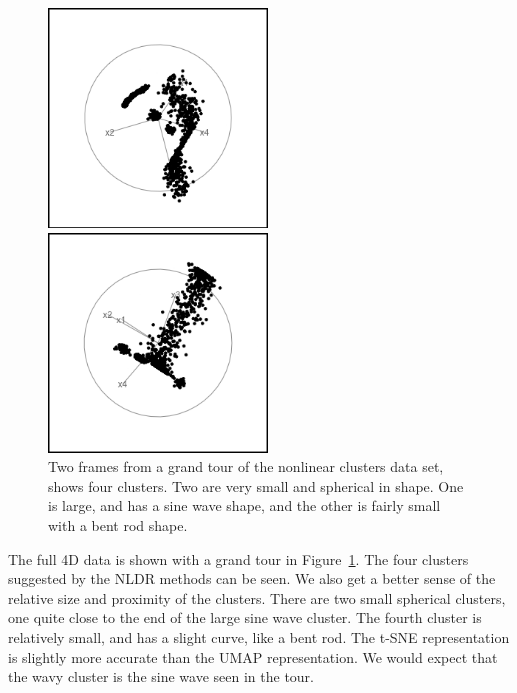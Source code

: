 \documentclass[
  letterpaper,
]{krantz}
\begin{document}
\begin{figure}

\begin{minipage}{0.50\linewidth}
\includegraphics[width=2.29167in,height=\textheight,keepaspectratio]{images/clusters_nonlin_60.png}\end{minipage}%
%
\begin{minipage}{0.50\linewidth}
\includegraphics[width=2.29167in,height=\textheight,keepaspectratio]{images/clusters_nonlin_233.png}\end{minipage}%

\caption{\label{fig-clusters-nonlin-pdf}Two frames from a grand tour of
the nonlinear clusters data set, shows four clusters. Two are very small
and spherical in shape. One is large, and has a sine wave shape, and the
other is fairly small with a bent rod shape. }

\end{figure}%

The full 4D data is shown with a grand tour in
Figure~\ref{fig-clusters-nonlin-pdf}. The four clusters suggested by the
NLDR methods can be seen. We also get a better sense of the relative
size and proximity of the clusters. There are two small spherical
clusters, one quite close to the end of the large sine wave cluster. The
fourth cluster is relatively small, and has a slight curve, like a bent
rod. The t-SNE representation is slightly more accurate than the UMAP
representation. We would expect that the wavy cluster is the sine wave
seen in the tour.
\end{document}
